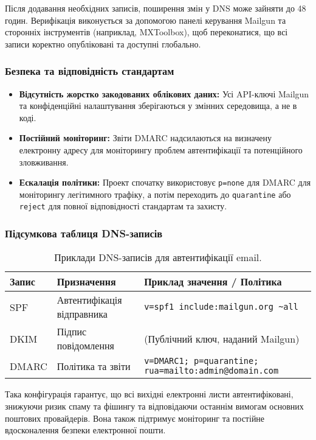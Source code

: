 Після додавання необхідних записів, поширення змін у DNS може зайняти до 48 годин. Верифікація виконується за допомогою панелі керування Mailgun та сторонніх інструментів (наприклад, MXToolbox), щоб переконатися, що всі записи коректно опубліковані та доступні глобально.

\subsubsection{Безпека та відповідність стандартам}

\begin{itemize}
    \item \textbf{Відсутність жорстко закодованих облікових даних:} Усі API-ключі Mailgun та конфіденційні налаштування зберігаються у змінних середовища, а не в коді.
    \item \textbf{Постійний моніторинг:} Звіти DMARC надсилаються на визначену електронну адресу для моніторингу проблем автентифікації та потенційного зловживання.
    \item \textbf{Ескалація політики:} Проект спочатку використовує \texttt{p=none} для DMARC для моніторингу легітимного трафіку, а потім переходить до \texttt{quarantine} або \texttt{reject} для повної відповідності стандартам та захисту.
\end{itemize}

\subsubsection{Підсумкова таблиця DNS-записів}

\begin{table}[h!]
\centering
\begin{tabular}{|l|l|l|}
\hline
\textbf{Запис} & \textbf{Призначення} & \textbf{Приклад значення / Політика} \\
\hline
SPF    & Автентифікація відправника & \texttt{v=spf1 include:mailgun.org \~{}all} \\
DKIM   & Підпис повідомлення & (Публічний ключ, наданий Mailgun) \\
DMARC  & Політика та звіти & \texttt{v=DMARC1; p=quarantine; rua=mailto:admin@domain.com} \\
\hline
\end{tabular}
\caption{Приклади DNS-записів для автентифікації email.}
\label{tab:dns_records_email}
\end{table}

Така конфігурація гарантує, що всі вихідні електронні листи автентифіковані, знижуючи ризик спаму та фішингу та відповідаючи останнім вимогам основних поштових провайдерів. Вона також підтримує моніторинг та постійне вдосконалення безпеки електронної пошти.

